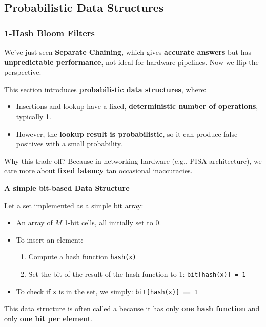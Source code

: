 \subsection{Probabilistic Data Structures}\label{subsection: Probabilistic Data Structures}

\subsubsection{1-Hash Bloom Filters}

We've just seen \textbf{Separate Chaining}, which gives \textbf{accurate answers} but has \textbf{unpredictable performance}, not ideal for hardware pipelines. Now we flip the perspective.

\highspace
This section introduces \textbf{probabilistic data structures}, where:
\begin{itemize}
    \item[\textcolor{Green3}{\faIcon{check}}] Insertions and lookup have a fixed, \textcolor{Green3}{\textbf{deterministic number of operations}}, typically 1.
    \item[\textcolor{Red2}{\faIcon{times}}] However, the \textcolor{Red2}{\textbf{lookup result is probabilistic}}, so it can produce false positives with a small probability.
\end{itemize}
Why this trade-off? Because in networking hardware (e.g., PISA architecture), we care more about \textbf{fixed latency} tan occasional inaccuracies.

\highspace
\begin{flushleft}
    \textcolor{Green3}{ \textbf{A simple bit-based Data Structure}}
\end{flushleft}
Let a set implemented as a simple bit array:
\begin{itemize}
    \item An array of $M$ 1-bit cells, all initially set to $0$.
    \item To insert an element:
    \begin{enumerate}
        \item Compute a hash function \texttt{hash(x)}
        \item Set the bit of the result of the hash function to 1: \texttt{bit[hash(x)] = 1}
    \end{enumerate}
    \item To check if \texttt{x} is in the set, we simply: \texttt{bit[hash(x)] == 1}
\end{itemize}
This data structure is often called a  because it has only \textbf{one hash function} and only \textbf{one bit per element}.

